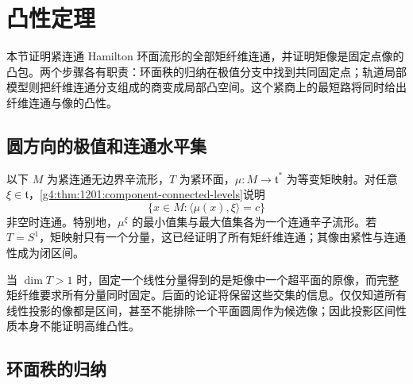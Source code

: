 
% 
% 

\section{凸性定理}
\label{g4:sec:1202}

本节证明紧连通 Hamilton 环面流形的全部矩纤维连通，并证明矩像是固定点像的凸包。两个步骤各有职责：环面秩的归纳在极值分支中找到共同固定点；轨道局部模型则把纤维连通分支组成的商变成局部凸空间。这个紧商上的最短路将同时给出纤维连通与像的凸性。

\subsection{圆方向的极值和连通水平集}
\label{g4:subsec:1202:01}

以下 \(M\) 为紧连通无边界辛流形，\(T\) 为紧环面，\(\mu:M\to\mathfrak t^*\) 为等变矩映射。对任意 \(\xi\in\mathfrak t\)，\cref{g4:thm:1201:component-connected-levels}说明
\[
	\{x\in M:\langle\mu(x),\xi\rangle=c\}
\]
非空时连通。特别地，\(\mu^\xi\) 的最小值集与最大值集各为一个连通辛子流形。若 \(T=S^1\)，矩映射只有一个分量，这已经证明了所有矩纤维连通；其像由紧性与连通性成为闭区间。

\ProseParagraphBreak

当 \(\dim T>1\) 时，固定一个线性分量得到的是矩像中一个超平面的原像，而完整矩纤维要求所有分量同时固定。后面的论证将保留这些交集的信息。仅仅知道所有线性投影的像都是区间，甚至不能排除一个平面圆周作为候选像；因此投影区间性质本身不能证明高维凸性。

\subsection{环面秩的归纳}
\label{g4:subsec:1202:02}

